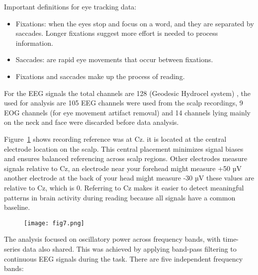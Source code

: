 \documentclass[journal]{IEEEtran}
\begin{document}
Important definitions for eye tracking data:
\begin{itemize}
	\item Fixations: when the eyes stop and focus on a word, and they are separated by saccades. Longer fixations suggest more effort is needed to process information.
	\item Saccades: are rapid eye movements that occur between fixations.
	\item Fixations and saccades make up the process of reading.
	      
\end{itemize}


For the EEG signals the total channels are 128 (Geodesic Hydrocel system) , the used for analysis are 105 EEG channels were used from the scalp recordings, 9 EOG channels (for eye movement artifact removal) and 14 channels lying mainly on the neck and face were discarded before data analysis. 

Figure~\ref{fig:scalp_channels} shows recording reference was at Cz. it is located at the central electrode location on the scalp. This central placement minimizes signal biases and ensures balanced referencing across scalp regions. Other electrodes measure signals relative to Cz, an electrode near your forehead might measure +50 µV another electrode at the back of your head might measure -30 µV these values are relative to Cz, which is 0. Referring to Cz makes it easier to detect meaningful patterns in brain activity during reading because all signals have a common baseline.


\begin{figure}[!h]
	\renewcommand{\arraystretch}{1.3}
	
	\centering
	\caption\normalsize{}
	\label{fig:scalp_channels}
	\texttt{[image: fig7.png]}     \vspace{-10pt} %
	
\end{figure}

The analysis focused on oscillatory power across frequency bands, with time-series data also shared. This was achieved by applying band-pass filtering to continuous EEG signals during the task. There are five independent frequency bands: 
\end{document}
